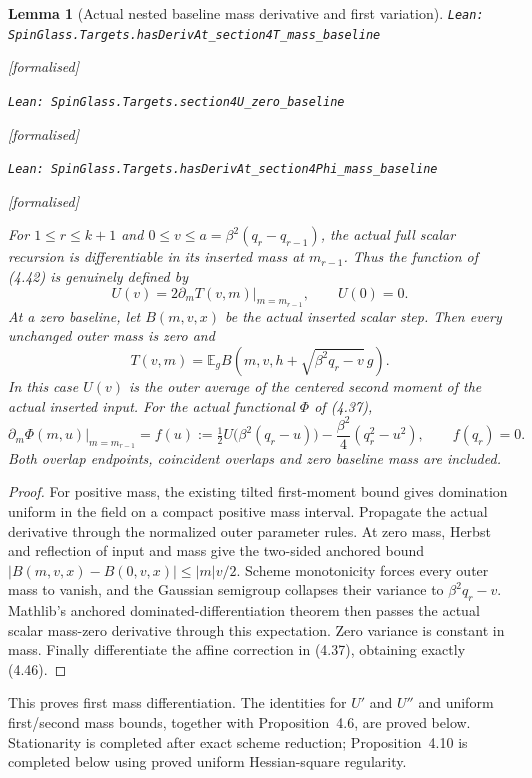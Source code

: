 \documentclass[11pt]{article}
\providecommand{\lean}[1]{\leavevmode\par\nopagebreak
  {\noindent\normalfont\footnotesize\raggedright\texttt{Lean: #1}\par}\nopagebreak}
\providecommand{\leanok}{\par\nopagebreak
  {\noindent\normalfont\footnotesize\textcolor{green!50!black}{[formalised]}\par}\nopagebreak}
\newtheorem{lemma}[theorem]{Lemma}
\begin{document}
\begin{lemma}[Actual nested baseline mass derivative and first variation]
\lean{SpinGlass.Targets.hasDerivAt\_section4T\_mass\_baseline}\leanok
\lean{SpinGlass.Targets.section4U\_zero\_baseline}\leanok
\lean{SpinGlass.Targets.hasDerivAt\_section4Phi\_mass\_baseline}\leanok
For $1\le r\le k+1$ and $0\le v\le a=\beta^2(q_r-q_{r-1})$, the actual
full scalar recursion is differentiable in its inserted mass at $m_{r-1}$.
Thus the function of (4.42) is genuinely defined by
\[
 U(v)=2\left.\partial_m T(v,m)\right|_{m=m_{r-1}},\qquad U(0)=0.
\]
At a zero baseline, let $B(m,v,x)$ be the actual inserted scalar step.
Then every unchanged outer mass is zero and
\[
 T(v,m)=\mathbb E_g B(m,v,h+\sqrt{\beta^2q_r-v}\,g).
\]
In this case $U(v)$ is the outer average of the centered second moment of
the actual inserted input. For the actual functional $\Phi$ of (4.37),
\[
 \left.\partial_m\Phi(m,u)\right|_{m=m_{r-1}}
 =f(u):=\tfrac12U\bigl(\beta^2(q_r-u)\bigr)
        -\frac{\beta^2}4(q_r^2-u^2),\qquad f(q_r)=0.
\]
Both overlap endpoints, coincident overlaps and zero baseline mass are included.
\end{lemma}
\begin{proof}
For positive mass, the existing tilted first-moment bound gives domination
uniform in the field on a compact positive mass interval. Propagate the
actual derivative through the normalized outer parameter rules. At zero mass,
Herbst and reflection of input and mass give the two-sided anchored bound
$|B(m,v,x)-B(0,v,x)|\le |m|v/2$. Scheme monotonicity forces every outer mass
to vanish, and the Gaussian semigroup collapses their variance to
$\beta^2q_r-v$. Mathlib's anchored dominated-differentiation theorem then
passes the actual scalar mass-zero derivative through this expectation.
Zero variance is constant in mass. Finally differentiate the affine correction
in (4.37), obtaining exactly (4.46).
\end{proof}
This proves first mass differentiation. The identities for $U'$ and $U''$
and uniform first/second mass bounds, together with Proposition~4.6, are
proved below. Stationarity is completed after exact scheme reduction;
Proposition~4.10 is completed below using proved uniform Hessian-square regularity.
\end{document}
